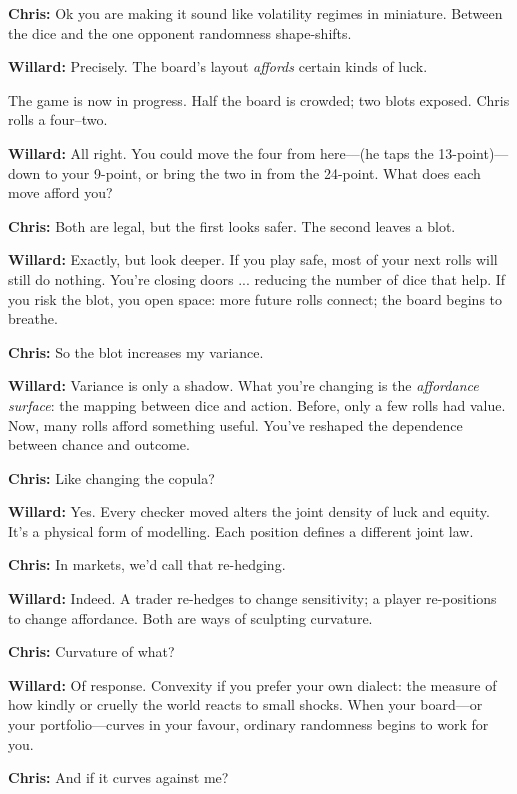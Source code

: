 \textbf{Chris:}  
Ok you are making it sound like volatility regimes in miniature.  Between the dice and the one opponent randomness shape-shifts.

\textbf{Willard:}  
Precisely.  
The board's layout \emph{affords} certain kinds of luck.

The game is now in progress.  Half the board is crowded; two blots exposed.  Chris rolls a four–two.

\vspace{0.2em}
\textbf{Willard:}  
All right. You could move the four from here—(he taps the 13-point)—
down to your 9-point, or bring the two in from the 24-point.
What does each move afford you?

\textbf{Chris:}  
Both are legal, but the first looks safer.
The second leaves a blot.

\textbf{Willard:}  
Exactly, but look deeper.
If you play safe, most of your next rolls will still do nothing.
You’re closing doors ... reducing the number of dice that help.
If you risk the blot, you open space:
more future rolls connect; the board begins to breathe.

\textbf{Chris:}  
So the blot increases my variance.

\textbf{Willard:}  
Variance is only a shadow.
What you’re changing is the \emph{affordance surface}:
the mapping between dice and action.
Before, only a few rolls had value.
Now, many rolls afford something useful.
You’ve reshaped the dependence between chance and outcome.

\textbf{Chris:}  
Like changing the copula?

\textbf{Willard:}  
Yes.  
Every checker moved alters the joint density of luck and equity.
It’s a physical form of modelling.
Each position defines a different joint law.

\textbf{Chris:}  
In markets, we’d call that re-hedging.

\textbf{Willard:}  
Indeed.
A trader re-hedges to change sensitivity;  
a player re-positions to change affordance.
Both are ways of sculpting curvature.

\textbf{Chris:}  
Curvature of what?

\textbf{Willard:}  
Of response.
Convexity if you prefer your own dialect:
the measure of how kindly or cruelly the world reacts to small shocks.
When your board—or your portfolio—curves in your favour,
ordinary randomness begins to work for you.

\textbf{Chris:}  
And if it curves against me?


